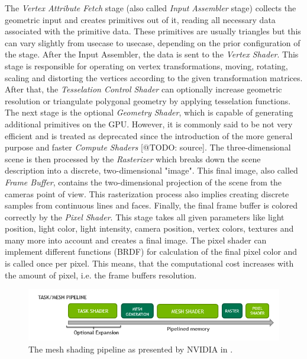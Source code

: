 \noindent
The \emph{Vertex Attribute Fetch} stage (also called \emph{Input Assembler} stage) collects the geometric 
input and creates primitives out of it, reading all necessary data associated with the primitive data. 
These primitives are usually triangles but this can vary slightly from usecase to usecase, depending
on the prior configuration of the stage. After the Input Assembler, the data is sent to the \emph{Vertex Shader}.
This stage is responsible for operating on vertex transformations, moving, rotating, scaling and distorting the 
vertices according to the given transformation matrices. After that, the \emph{Tesselation Control Shader} can 
optionally increase geometric resolution or triangulate polygonal geometry by applying tesselation functions.
The next stage is the optional \emph{Geometry Shader}, which is capable of generating additional primitives 
on the \ac{GPU}. However, it is commonly said to be not very efficient and is treated as deprecated since the 
introduction of the more general purpose and faster \emph{Compute Shaders} [@TODO: source]. 
The three-dimensional scene is then processed by the \emph{Rasterizer} which breaks down the scene description into 
a discrete, two-dimensional "image". This final image, also called \emph{Frame Buffer}, contains the two-dimensional 
projection of the scene from the cameras point of view. This rasterization process also implies creating discrete 
samples from continuous lines and faces.
Finally, the final frame buffer is colored correctly by the \emph{Pixel Shader}. This stage takes all given parameters 
like light position, light color, light intensity, camera position, vertex colors, textures and many more into account 
and creates a final image. The pixel shader can implement different functions (\ac{BRDF}) for calculation of the final 
pixel color and is called once per pixel. This means, that the computational cost increases with the amount of pixel, 
i.e. the frame buffers resolution. 


\begin{figure}[h]
    \centering
    \includegraphics[width=\linewidth]{images/graphics/mesh-rendering-pipeline.png}
    \caption{The mesh shading pipeline as presented by NVIDIA in \cite[Christoph Kubisch]{Kubisch2018}.}
    \label{fig:mesh-rendering-pipeline}
\end{figure}

